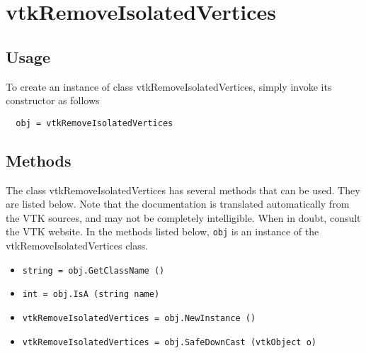 \section{vtkRemoveIsolatedVertices}

\subsection{Usage}


To create an instance of class vtkRemoveIsolatedVertices, simply
invoke its constructor as follows
\begin{verbatim}
  obj = vtkRemoveIsolatedVertices
\end{verbatim}
\subsection{Methods}

The class vtkRemoveIsolatedVertices has several methods that can be used.
  They are listed below.
Note that the documentation is translated automatically from the VTK sources,
and may not be completely intelligible.  When in doubt, consult the VTK website.
In the methods listed below, \verb|obj| is an instance of the vtkRemoveIsolatedVertices class.
\begin{itemize}
\item  \verb|string = obj.GetClassName ()|

\item  \verb|int = obj.IsA (string name)|

\item  \verb|vtkRemoveIsolatedVertices = obj.NewInstance ()|

\item  \verb|vtkRemoveIsolatedVertices = obj.SafeDownCast (vtkObject o)|

\end{itemize}
